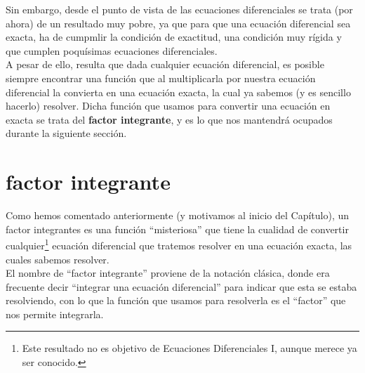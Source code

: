 Sin embargo, desde el punto de vista de las ecuaciones diferenciales se trata (por ahora) de un resultado muy pobre, ya que para que una ecuación diferencial sea exacta, ha de cumpmlir la condición de exactitud, una condición muy rígida y que cumplen poquísimas ecuaciones diferenciales.\\

A pesar de ello, resulta que dada cualquier ecuación diferencial, es posible siempre encontrar una función que al multiplicarla por nuestra ecuación diferencial la convierta en una ecuación exacta, la cual ya sabemos (y es sencillo hacerlo) resolver. Dicha función que usamos para convertir una ecuación en exacta se trata del \textbf{factor integrante}, y es lo que nos mantendrá ocupados durante la siguiente sección.

\section{factor integrante}
Como hemos comentado anteriormente (y motivamos al inicio del Capítulo), un factor integrantes es una función ``misteriosa'' que tiene la cualidad de convertir cualquier\footnote{Este resultado no es objetivo de Ecuaciones Diferenciales I, aunque merece ya ser conocido.} ecuación diferencial que tratemos resolver en una ecuación exacta, las cuales sabemos resolver.\\

El nombre de ``factor integrante'' proviene de la notación clásica, donde era frecuente decir ``integrar una ecuación diferencial'' para indicar que esta se estaba resolviendo, con lo que la función que usamos para resolverla es el ``factor'' que nos permite integrarla.\\

